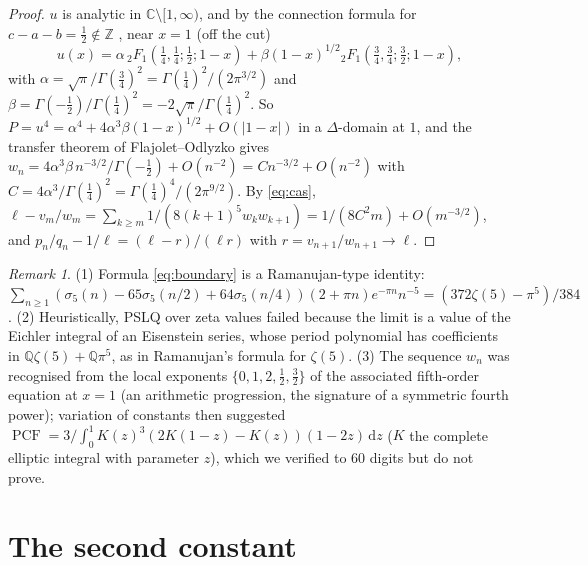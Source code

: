 \documentclass[11pt]{amsart}
\theoremstyle{definition}
\theoremstyle{remark}
\newtheorem{remark}[theorem]{Remark}
\numberwithin{equation}{section}
\newcommand{\PCF}{\operatorname{PCF}}
\newcommand{\Q}{\mathbb{Q}}
\newcommand{\Z}{\mathbb{Z}}
\newcommand{\C}{\mathbb{C}}
\newcommand{\dd}{\,\mathrm{d}}
\begin{document}
\begin{proof}
$u$ is analytic in $\C\setminus[1,\infty)$, and by the connection formula for $c-a-b=\frac12\notin\Z$ \cite[\S15.8(ii)]{DLMF}, near $x=1$ (off the cut)
\[
u(x)=\alpha\,{}_2F_1(\tfrac14,\tfrac14;\tfrac12;1-x)+\beta(1-x)^{1/2}{}_2F_1(\tfrac34,\tfrac34;\tfrac32;1-x),
\]
with $\alpha=\sqrt\pi/\Gamma(\frac34)^2=\Gamma(\frac14)^2/(2\pi^{3/2})$ and $\beta=\Gamma(-\frac12)/\Gamma(\frac14)^2=-2\sqrt\pi/\Gamma(\frac14)^2$.
So $P=u^4=\alpha^4+4\alpha^3\beta(1-x)^{1/2}+O(|1-x|)$ in a $\Delta$-domain at $1$, and the transfer theorem of Flajolet--Odlyzko \cite{FO} gives $w_n=4\alpha^3\beta\,n^{-3/2}/\Gamma(-\frac12)+O(n^{-2})=Cn^{-3/2}+O(n^{-2})$ with $C=4\alpha^3/\Gamma(\frac14)^2=\Gamma(\frac14)^4/(2\pi^{9/2})$. By \eqref{eq:cas}, $\ell-v_m/w_m=\sum_{k\ge m}1/(8(k+1)^5w_kw_{k+1})=1/(8C^2m)+O(m^{-3/2})$, and $p_n/q_n-1/\ell=(\ell-r)/(\ell r)$ with $r=v_{n+1}/w_{n+1}\to\ell$.
\end{proof}

\begin{remark}\label{rem:U1}
(1) Formula \eqref{eq:boundary} is a Ramanujan-type identity:
$\sum_{n\ge1}(\sigma_5(n)-65\sigma_5(n/2)+64\sigma_5(n/4))(2+\pi n)e^{-\pi n}n^{-5}=(372\zeta(5)-\pi^5)/384$.
(2) Heuristically, PSLQ over zeta values failed because the limit is a value of the Eichler integral of an Eisenstein series, whose period polynomial has coefficients in $\Q\zeta(5)+\Q\pi^5$, as in Ramanujan's formula for $\zeta(5)$. (3) The sequence $w_n$ was recognised from the local exponents $\{0,1,2,\frac12,\frac32\}$ of the associated fifth-order equation at $x=1$ (an arithmetic progression, the signature of a symmetric fourth power); variation of constants then suggested $\PCF=3\big/\int_0^1K(z)^3(2K(1-z)-K(z))(1-2z)\dd z$ ($K$ the complete elliptic integral with parameter $z$), which we verified to 60 digits but do not prove.
\end{remark}

\section{The second constant}\label{sec:U2}
\end{document}
